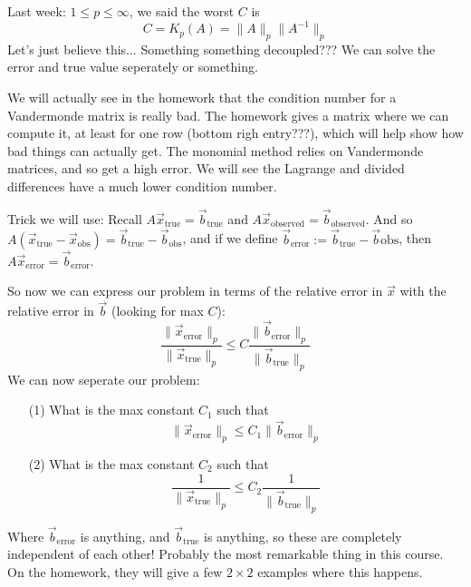 \documentclass{article}
\theoremstyle{plain}
\theoremstyle{remark}
\begin{document}
Last week: $1 \leq p \leq \infty$, we said the worst $C$ is
\[
	C = K_p(A) = \lVert A \rVert_p \lVert A^{-1} \rVert_p
\]
Let's just believe this...
Something something decoupled???
We can solve the error and true value seperately or something.

We will actually see in the homework that the condition number for a Vandermonde matrix
is really bad.
The homework gives a matrix where we can compute it, at least for one row (bottom righ entry???),
which will help show how bad things can actually get.
The monomial method relies on Vandermonde matrices, and so get a high error.
We will see the Lagrange and divided differences have a much lower condition number.

Trick we will use:
Recall $A\vec{x}_{\text{true}} = \vec{b}_{\text{true}}$
and $A\vec{x}_{\text{observed}} = \vec{b}_{\text{observed}}$.
And so $A(\vec{x}_{\text{true}} - \vec{x}_{\text{obs}}) =
\vec{b}_{\text{true}} - \vec{b}_{\text{obs}}$,
and if we define $\vec{b}_{\text{error}} := \vec{b}_{\text{true}} - \vec{b}{\text{obs}}$,
then $A\vec{x}_{\text{error}} = \vec{b}_{\text{error}}$.

So now we can express our problem in terms of the relative error in $\vec{x}$ with
the relative error in $\vec{b}$ (looking for max $C$):
\[
	\frac{\lVert \vec{x}_{\text{error}}\rVert_p}{\lVert \vec{x}_{\text{true}}\rVert_p}
	\leq C\frac{\lVert \vec{b}_{\text{error}}\rVert_p}{\lVert \vec{b}_{\text{true}}\rVert_p}
\]
We can now seperate our problem:
\begin{enumerate}
	\item[(1)] What is the max constant $C_1$ such that
		\[
			\lVert \vec{x}_{\text{error}} \rVert_p \leq C_1
			\lVert \vec{b}_{\text{error}} \rVert_p
		\]
	\item[(2)] What is the max constant $C_2$ such that
		\[
			\frac{1}{\lVert \vec{x}_{\text{true}} \rVert_p} \leq C_2
			\frac{1}{\lVert \vec{b}_{\text{true}} \rVert_p}
		\]
\end{enumerate}
Where $\vec{b}_{\text{error}}$ is anything, and $\vec{b}_{\text{true}}$ is anything,
so these are completely independent of each other!
Probably the most remarkable thing in this course.
On the homework, they will give a few $2 \times 2$ examples where this happens.
\end{document}
